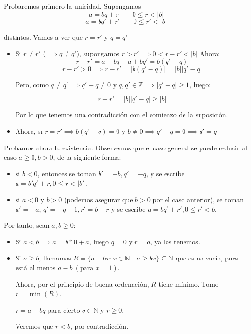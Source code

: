 \documentclass[11pt, a4paper, titlepage]{article}
\makeatletter
\renewenvironment{proof}[1][\proofname] {\vspace{-15pt}\par\pushQED{\qed}\normalfont\topsep6\p@\@plus6\p@\relax\trivlist\item[\hskip\labelsep\it#1\@addpunct{.}]\ignorespaces}{\popQED\endtrivlist\@endpefalse}
\providecommand{\ent}{\mathbb{Z}}
\providecommand{\nat}{\mathbb{N}}
\providecommand{\abs}[1]{\lvert#1\rvert}
\theoremstyle{theorem-style}
\theoremstyle{definition-style}
\theoremstyle{remark-style}
\theoremstyle{example-style}
\makeatother
\begin{document}
\begin{proof}
Probaremos primero la unicidad. Supongamos 
$$a=bq+r \quad \quad 0\leq r <\abs{b}$$   
$$a=bq'+r' \quad \quad 0 \leq r' < \abs{b}$$ 

distintos. Vamos a ver que $r=r'$ y $q=q'$

\begin{itemize}
	\item Si $r \neq r'$ ($\implies q\ne q'$), supongamos $r > r' \implies 0 < r - r' < \abs{b}$
Ahora: 
$$ r-r' = a-bq - a +bq' = b(q' -q )$$
$$r-r' > 0 \implies r - r' = \abs{b(q' -q)} = \abs{b}\abs{q' -q}$$

Pero, como $q\neq q' \implies q'-q \neq 0$ y $q,q' \in \ent \implies \abs{q' -q} \geq 1 $, luego:

$$ r-r' = \abs{b}\abs{q' -q} \geq \abs{b}$$

Por lo que tenemos una contradicción con el comienzo de la suposición.

	\item Ahora, si $r=r'\implies b(q' -q) = 0$ y $b\neq 0 \implies q' -q=0 \implies q' =q$
\end{itemize}

Probamos ahora la existencia. Observemos que el caso general se puede reducir al caso $a \ge 0, b > 0$, de la
siguiente forma:

\begin{itemize}
\item si $b<0$, entonces se toman $b' = -b, q' = -q$, y se escribe $a = b'q' +r, 0 \le r < |b'|$.
\item si $a<0$ y $b>0$ (podemos asegurar que $b>0$ por el caso anterior), se toman $a' = -a$, $q' = -q -1, r' = b-r$
  y se escribe $a = bq'+r', 0 \le r' < b$.
\end{itemize}

Por tanto, sean $a,b \geq 0$:

\begin{itemize}
	\item Si $ a < b \implies a = b*0 + a$, luego $q=0$ y $r=a$, ya los tenemos.
	\item Si $a \geq b$, llamamos $R=\{a-bx: x\in \nat \quad a \geq bx\}\subseteq \nat$ que es no vacío, pues está al menos $ a-b \ (\text{para } x=1)$.
	
	Ahora, por el principio de buena ordenación, $R$ tiene mínimo. Tomo $r=\min(R)$. 
	
$r=a-bq$ para cierto $q \in \nat$ y $ r \geq 0$.

Veremos que $r < b$, por contradicción.


\end{itemize}
\end{proof}
\end{document}
